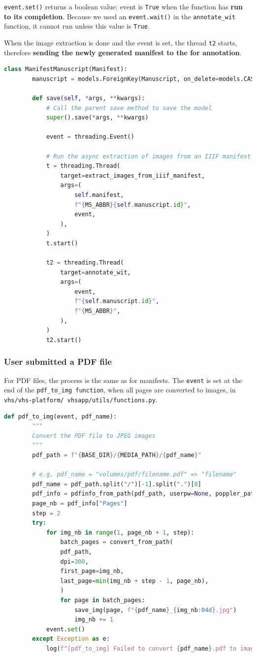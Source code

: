 		\texttt{event.set()} returns a boolean value: event is \texttt{True} when the function has \textbf{run to its completion}. Because we used an \texttt{event.wait()} in the \texttt{annotate\_wit} function, it cannot run unless this value is \texttt{True}.
		
		When the image extraction is done and the event is set, the thread \texttt{t2} starts, therefore \textbf{sending the newly generated manifest to the \api for annotation}.

		\begin{lstlisting}[language=Python]
	class ManifestManuscript(Manifest):
		manuscript = models.ForeignKey(Manuscript, on_delete=models.CASCADE)
		
		def save(self, *args, **kwargs):
			# Call the parent save method to save the model
			super().save(*args, **kwargs)
			
			event = threading.Event()
		
			# Run the async extraction of images from an IIIF manifest in the background using threading
			t = threading.Thread(
				target=extract_images_from_iiif_manifest,
				args=(
					self.manifest,
					f"{MS_ABBR}{self.manuscript.id}",
					event,
				),
			)
			t.start()
			
			t2 = threading.Thread(
				target=annotate_wit,
				args=(
					event,
					f"{self.manuscript.id}",
					f"{MS_ABBR}",
				),
			)
			t2.start()\end{lstlisting}
	
		\subsubsection{User submitted a PDF file}
		For PDF files, the process is the same as for manifests.
		The \texttt{event} is set at the end of the \texttt{pdf\_to\_img function}, when all pages are converted to images, in \texttt{vhs/vhs-platform/ vhsapp/utils/functions.py}.

		\begin{lstlisting}[language=Python]
	def pdf_to_img(event, pdf_name):
		"""
		Convert the PDF file to JPEG images
		"""
		pdf_path = f"{BASE_DIR}/{MEDIA_PATH}/{pdf_name}"
		
		# e.g. pdf_name = "volumes/pdf/filename.pdf" => "filename"
		pdf_name = pdf_path.split("/")[-1].split(".")[0]
		pdf_info = pdfinfo_from_path(pdf_path, userpw=None, poppler_path=None)
		page_nb = pdf_info["Pages"]
		step = 2
		try:
			for img_nb in range(1, page_nb + 1, step):
				batch_pages = convert_from_path(
				pdf_path,
				dpi=300,
				first_page=img_nb,
				last_page=min(img_nb + step - 1, page_nb),
				)
				for page in batch_pages:
					save_img(page, f"{pdf_name}_{img_nb:04d}.jpg")
					img_nb += 1
			event.set()
		except Exception as e:
			log(f"[pdf_to_img] Failed to convert {pdf_name}.pdf to images:\n{e}")\end{lstlisting}

